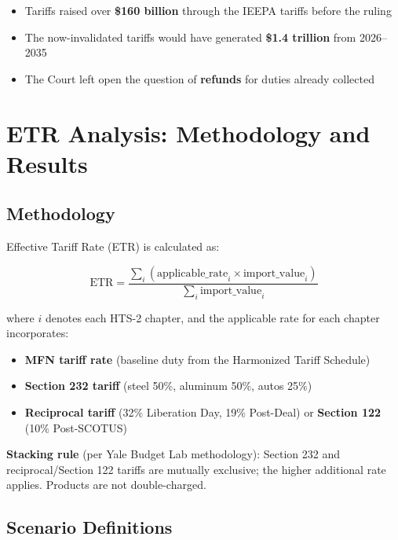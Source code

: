 \documentclass[12pt,a4paper]{article}
\begin{document}
\begin{itemize}
    \item Tariffs raised over \textbf{\$160 billion} through the IEEPA tariffs before the ruling
    \item The now-invalidated tariffs would have generated \textbf{\$1.4 trillion} from 2026--2035
    \item The Court left open the question of \textbf{refunds} for duties already collected
\end{itemize}

\section{ETR Analysis: Methodology and Results}

\subsection{Methodology}

Effective Tariff Rate (ETR) is calculated as:

\begin{equation}
\text{ETR} = \frac{\sum_{i} (\text{applicable\_rate}_i \times \text{import\_value}_i)}{\sum_{i} \text{import\_value}_i}
\end{equation}

\noindent where $i$ denotes each HTS-2 chapter, and the applicable rate for each chapter incorporates:

\begin{itemize}
    \item \textbf{MFN tariff rate} (baseline duty from the Harmonized Tariff Schedule)
    \item \textbf{Section 232 tariff} (steel 50\%, aluminum 50\%, autos 25\%)
    \item \textbf{Reciprocal tariff} (32\% Liberation Day, 19\% Post-Deal) or \textbf{Section 122} (10\% Post-SCOTUS)
\end{itemize}

\noindent\textbf{Stacking rule} (per Yale Budget Lab methodology): Section 232 and reciprocal/Section 122 tariffs are mutually exclusive; the higher additional rate applies. Products are not double-charged.

\subsection{Scenario Definitions}
\end{document}
